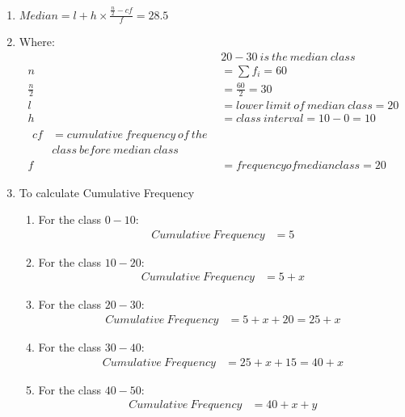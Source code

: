 \renewcommand{\theequation}{\theenumi}

\begin{enumerate}

\item $Median = l + h \times \frac{\frac{n}{2} - cf}{f} = 28.5$

\item Where:
\begin{align*}
&20-30\ is\ the\ median\ class\\
n &= \sum f_i = 60 \\
\frac{n}{2} &= \frac{60}{2} = 30\\
l &= lower\ limit\ of\ median\ class = 20\\
h &= class\ interval = 10 - 0 = 10 \\
\begin{split}
cf &= cumulative\ frequency\ of\ the \\
&class\ before\ median\ class 
\end{split}\\
f &= frequency of median class = 20
\end{align*}

\item To calculate Cumulative Frequency 
\begin{enumerate}

\item For the class $0-10$:
\begin{align*}
Cumulative\ Frequency &= 5
\end{align*}

\item For the class $10-20$:
\begin{align*}
Cumulative\ Frequency &= 5 + x 
\end{align*}

\item For the class $20-30$:
\begin{align*}
Cumulative\ Frequency &= 5 + x + 20 = 25 + x
\end{align*}

\item For the class $30-40$:
\begin{align*}
Cumulative\ Frequency &= 25 + x + 15 = 40 + x 
\end{align*}

\item For the class $40-50$:
\begin{align*}
Cumulative\ Frequency &= 40 + x + y
\end{align*}


\end{enumerate}
\end{enumerate}
